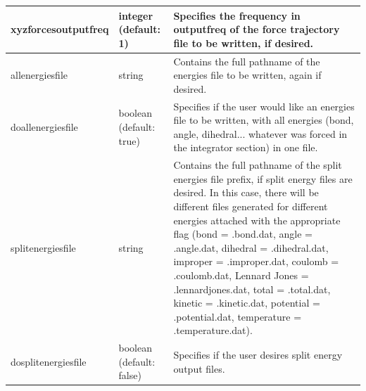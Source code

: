 \documentclass[11pt]{report}
\begin{document}
\begin{tabular}{|p{5.5cm}|p{4cm}|p{6cm}|}
   
    xyzforcesoutputfreq &
    integer (default: 1) &
    Specifies the frequency in outputfreq of the force trajectory file to be written, if desired.\\\hline

    allenergiesfile &
    string &
    Contains the full pathname of the energies file to be written, again if desired.  \\\hline


    doallenergiesfile &
    boolean (default: true) &
    Specifies if the user would like an energies file to be written, with all energies (bond, angle, dihedral... whatever was forced in the integrator section) in one file. \\\hline
 

    splitenergiesfile &
    string &
    Contains the full pathname of the split energies file prefix, if split energy files are desired.  In this case, there will be different files generated for different energies attached with the appropriate flag (bond = .bond.dat, angle = .angle.dat, dihedral = .dihedral.dat, improper = .improper.dat, coulomb = .coulomb.dat, Lennard Jones = .lennardjones.dat, total = .total.dat, kinetic = .kinetic.dat, potential = .potential.dat, temperature = .temperature.dat). \\\hline 


    dosplitenergiesfile &
    boolean (default: false) &
    Specifies if the user desires split energy output files. \\\hline
   

  \end{tabular}
  \newpage
\end{document}
